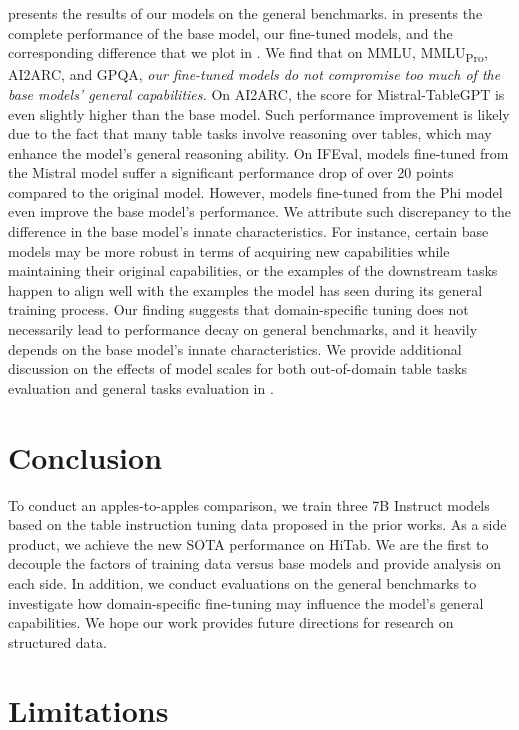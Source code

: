 \documentclass[11pt]{article}
\begin{document}
 presents the results of our models on the general benchmarks.
 in  presents the complete performance of the base model, our fine-tuned models, and the corresponding difference that we plot in .
We find that on MMLU, MMLU\textsubscript{Pro}, AI2ARC, and GPQA, \textit{our fine-tuned models do not compromise too much of the base models' general capabilities.}
On AI2ARC, the score for Mistral-TableGPT is even slightly higher than the base model.
Such performance improvement is likely due to the fact that many table tasks involve reasoning over tables, which may enhance the model's general reasoning ability.
On IFEval, models fine-tuned from the Mistral model suffer a significant performance drop of over 20 points compared to the original model.
However, models fine-tuned from the Phi model even improve the base model's performance.
We attribute such discrepancy to the difference in the base model's innate characteristics.
For instance, certain base models may be more robust in terms of acquiring new capabilities while maintaining their original capabilities, or the examples of the downstream tasks happen to align well with the examples the model has seen during its general training process.
Our finding suggests that domain-specific tuning does not necessarily lead to performance decay on general benchmarks, and it heavily depends on the base model's innate characteristics.
We provide additional discussion on the effects of model scales for both out-of-domain table tasks evaluation and general tasks evaluation in .



\section{Conclusion}
To conduct an apples-to-apples comparison, we train three 7B Instruct models based on the table instruction tuning data proposed in the prior works.
As a side product, we achieve the new SOTA performance on HiTab.
We are the first to decouple the factors of training data versus base models and provide analysis on each side.
In addition, we conduct evaluations on the general benchmarks to investigate how domain-specific fine-tuning may influence the model's general capabilities.
We hope our work provides future directions for research on structured data.


\section*{Limitations}
\end{document}
